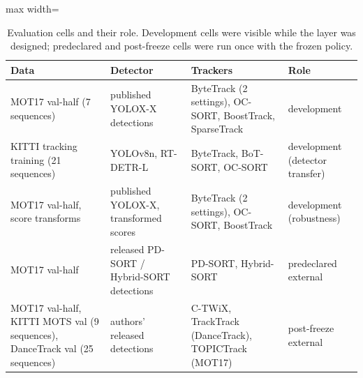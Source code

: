 \begin{table}[tbp]
\centering
\caption{Evaluation cells and their role. Development cells were visible while the layer was designed; predeclared and post-freeze cells were run once with the frozen policy.}
\label{tab:ch5-data}
\small\setlength{\tabcolsep}{4pt}
\begin{adjustbox}{max width=\textwidth}
\begin{tabular}{>{\raggedright\arraybackslash}p{3.0cm}>{\raggedright\arraybackslash}p{3.6cm}>{\raggedright\arraybackslash}p{4.6cm}>{\raggedright\arraybackslash}p{3.2cm}}
\hline
Data & Detector & Trackers & Role \\
\hline
MOT17 val-half (7 sequences) & published YOLOX-X detections & ByteTrack (2 settings), OC-SORT, BoostTrack, SparseTrack & development \\
KITTI tracking training (21 sequences) & YOLOv8n, RT-DETR-L & ByteTrack, BoT-SORT, OC-SORT & development (detector transfer) \\
MOT17 val-half, score transforms & published YOLOX-X, transformed scores & ByteTrack (2 settings), OC-SORT, BoostTrack & development (robustness) \\
MOT17 val-half & released PD-SORT / Hybrid-SORT detections & PD-SORT, Hybrid-SORT & predeclared external \\
MOT17 val-half, KITTI MOTS val (9 sequences), DanceTrack val (25 sequences) & authors' released detections & C-TWiX, TrackTrack (DanceTrack), TOPICTrack (MOT17) & post-freeze external \\
\hline
\end{tabular}
\end{adjustbox}
\end{table}
